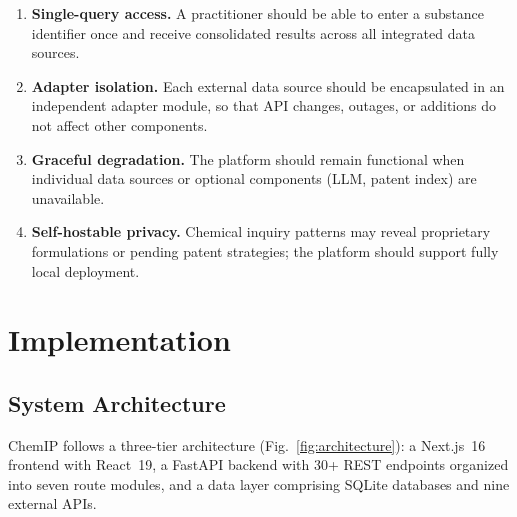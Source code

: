 \documentclass[10pt]{article}
\begin{document}
\begin{enumerate}[nosep]
  \item \textbf{Single-query access.} A practitioner should be able to enter a substance identifier once and receive consolidated results across all integrated data sources.
  \item \textbf{Adapter isolation.} Each external data source should be encapsulated in an independent adapter module, so that API changes, outages, or additions do not affect other components.
  \item \textbf{Graceful degradation.} The platform should remain functional when individual data sources or optional components (LLM, patent index) are unavailable.
  \item \textbf{Self-hostable privacy.} Chemical inquiry patterns may reveal proprietary formulations or pending patent strategies; the platform should support fully local deployment.
\end{enumerate}

\section{Implementation}
\label{sec:implementation}

\subsection{System Architecture}

ChemIP follows a three-tier architecture (Fig.~\ref{fig:architecture}): a Next.js~16 frontend with React~19, a FastAPI backend with 30+ REST endpoints organized into seven route modules, and a data layer comprising SQLite databases and nine external APIs.
\end{document}
